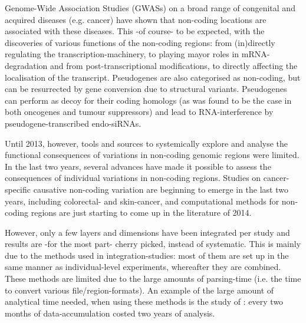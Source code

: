 \documentclass[twoside,fontsize=12pt]{article}
\begin{document}
\noindent
Genome-Wide Association Studies (GWASs) on a broad range of congenital and acquired diseases (e.g. cancer) have shown that non-coding locations are associated with these diseases. This -of course- to be expected, with the discoveries of various functions of the non-coding regions: from (in)directly regulating the transcription-machinery, to playing mayor roles in mRNA-degradation and from post-transcriptional modifications, to directly affecting the localisation of the transcript\cite{Pichon2012,Barrett2012}. Pseudogenes are also categorised as non-coding, but can be resurrected by gene conversion due to structural variants\cite{Kidd2010}. Pseudogenes can perform as decoy for their coding homologs\cite{Poliseno2010} (as was found to be the case in both oncogenes and tumour suppressors) and lead to RNA-interference by pseudogene-transcribed endo-siRNAs\cite{Tam2008}.

Until 2013, however, tools and sources to systemically explore and analyse the functional consequences of variations in non-coding genomic regions were limited. In the last two years, several advances have made it possible to assess the consequences of individual variations in non-coding regions\cite{Ongen2014,Khurana2013}. Studies on cancer-specific causative non-coding variation are beginning to emerge in the last two years, including colorectal- and skin-cancer\cite{Ongen2014,Huang2013}, and computational methods for non-coding regions are just starting to come up in the literature of 2014\cite{Khurana2013,Kircher2014}. %
\medskip

\noindent
However, only a few layers and dimensions have been integrated per study and results are -for the most part- cherry picked, instead of systematic. This is mainly due to the methods used in integration-studies: most of them are set up in the same manner as individual-level experiments, whereafter they are combined. These methods are limited due to the large amounts of parsing-time (i.e. the time to convert various file/region-formats). An example of the large amount of analytical time needed, when using these methods is the study of \citet{Munoz2011}: every two months of data-accumulation costed two years of analysis.
\end{document}
